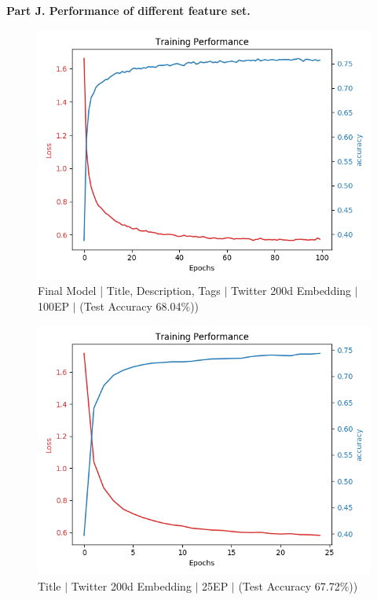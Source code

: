 \documentclass[english]{article}
\begin{document}
\pagebreak

\bf{Part J. Performance of different feature set.}\\
\begin{figure}[H]
      \centering
        \includegraphics[scale=0.5]{loss_1.png}
        \caption{Final Model | Title, Description, Tags $|$ Twitter 200d Embedding $|$ 100EP $|$ (Test Accuracy 68.04\%))}
    \end{figure}
    
    
    \begin{figure}[H]
      \centering
        \includegraphics[scale=0.5]{loss_2.png}
        \caption{Title $|$ Twitter 200d Embedding $|$ 25EP $|$ (Test Accuracy 67.72\%))}
    \end{figure}
\pagebreak

\newpage



\end{document}
